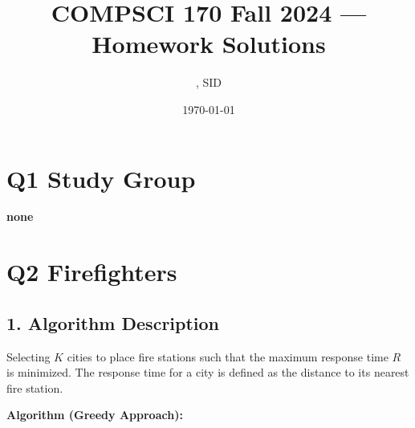 \documentclass[11pt]{article}
\title{COMPSCI 170 Fall 2024 --- Homework \Homework Solutions}
\author{\Name, SID \SID}
\date{\today}
\begin{document}
\maketitle

\section*{Q1 Study Group}

\textbf{none}

\newpage

\section*{Q2 Firefighters}

\subsection*{1. Algorithm Description}

Selecting \( K \) cities to place fire stations such that the maximum response time \( R \) is minimized. The response time for a city is defined as the distance to its nearest fire station.

\textbf{Algorithm (Greedy Approach):}
\end{document}

